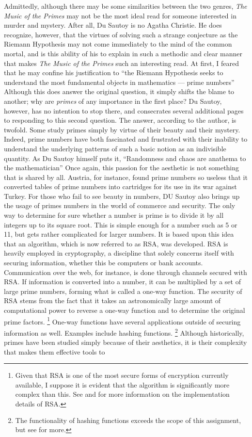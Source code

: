 \documentclass{mathbook}
\begin{document}
    Admittedly, although there may be some similarities between the two genres, \emph{The Music of the Primes} may not be the most ideal read for someone interested in murder and mystery. After all, Du Sautoy is no Agatha Christie. He does recognize, however, that the virtues of solving such a strange conjecture as the Riemann Hypothesis may not come immediately to the mind of the common mortal, and is this ability of his to explain in such a methodic and clear manner that makes \emph{The Music of the Primes} such an interesting read. At first, I feared that he may confine his justification to ``the Riemann Hypothesis seeks to understand the most fundamental objects in mathematics –– prime numbers'' \cite[p.~5]{Sautoy2003} Although this does answer the original question, it simply shifts the blame to another; why are \emph{primes} of any importance in the first place? Du Sautoy, however, has no intention to stop there, and consecrates several additional pages to responding to this second question. The answer, according to the author, is twofold. Some study primes simply by virtue of their beauty and their mystery. Indeed, prime numbers have both fascinated and frustrated with their inability to understand the underlying patterns of such a basic notion as an indivisible quantity. As Du Sautoy himself puts it, ``Randomness and chaos are anathema to the mathematician'' \cite[p.~7]{Sautoy2003} Once again, this passion for the aesthetic is not something that is shared by all. Austria, for instance, found prime numbers so useless that it converted tables of prime numbers into cartridges for its use in its war against Turkey. \cite[p.~47]{Sautoy2003} For those who fail to see beauty in numbers, DU Sautoy also brings up the usage of primes numbers in the world of commerce and security. The only way to determine for sure whether a number is prime is to divide it by all integers up to its square root. This is simple enough for a number such as 5 or 11, but gets rather complicated for larger numbers. It is based upon this idea that an algorithm, which is now referred to as RSA, was developed. RSA is heavily employed in cryptography, a discipline that solely concerns itself with securing information, whether this be computers or bank accounts. Communication over the web, for instance, is done through channels secured with RSA. If information is converted into a number, it can be multiplied by a set of large prime numbers, forming what is called a one-way function. The security of RSA stems from the fact that it takes an astronomically large amount of computational power to reverse a one-way function and to determine the original prime factors. \footnote{Given that RSA is one of the most secure forms of encryption currently available, I suppose it is evident that the algorithm is significantly more complex than this. See \cite{2017} and \cite{Lake2018} for more information on the implementation details of RSA.} One-way functions have several applications outside of securing information as well. Examples include hashing functions. \footnote{The functionality of hashing functions exceeds the scope of this assignment, but see \cite{2020} for more.} Although historically, primes have been studied simply because of their aesthetics, it is their complexity that makes them effective tools to 
\end{document}
